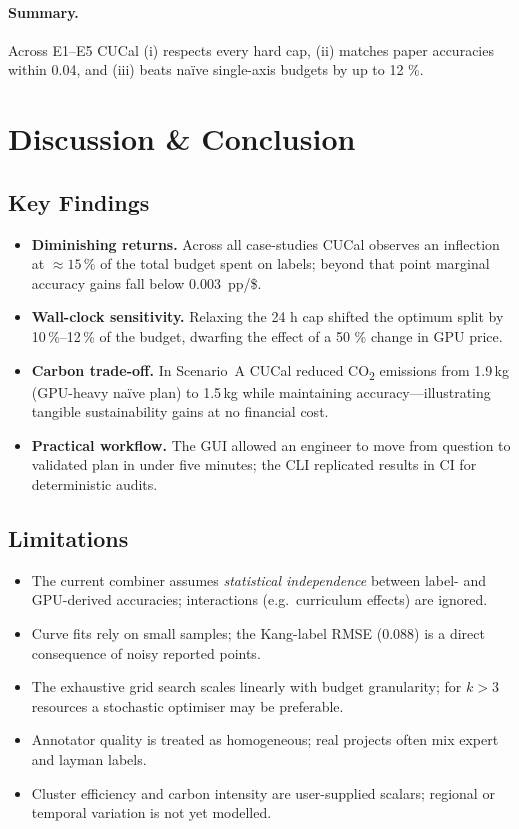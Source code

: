\documentclass[11pt]{article}
\begin{document}
\paragraph{Summary.}
Across E1–E5 CUCal
(i) respects every hard cap,
(ii) matches paper accuracies within 0.04,
and (iii) beats naïve single-axis budgets by up to 12 \%.

\section{Discussion \& Conclusion}\label{sec:discussion}
\subsection{Key Findings}
\setlength\itemsep{0.3em}
\begin{itemize}
  \item \textbf{Diminishing returns.}  Across all case-studies CUCal
        observes an inflection at $\approx\!15$\,\% of the total budget
        spent on labels; beyond that point marginal accuracy gains fall
        below 0.003~pp/\$.
  \item \textbf{Wall-clock sensitivity.}  Relaxing the 24 h cap shifted
        the optimum split by 10\,\%–12\,\% of the budget, dwarfing the effect
        of a 50 \% change in GPU price.
  \item \textbf{Carbon trade-off.}  In Scenario~A CUCal reduced
        CO\textsubscript{2} emissions from 1.9\,kg (GPU-heavy naïve plan) to
        1.5\,kg while maintaining accuracy—illustrating tangible
        sustainability gains at no financial cost.
  \item \textbf{Practical workflow.}  The GUI allowed an engineer to move
        from question to validated plan in under five minutes; the CLI
        replicated results in CI for deterministic audits.
\end{itemize}

\subsection{Limitations}
\begin{itemize}
  \item The current combiner assumes \emph{statistical independence} between
        label- and GPU-derived accuracies; interactions (e.g.\ curriculum
        effects) are ignored.
  \item Curve fits rely on small samples; the Kang-label RMSE (0.088) is a
        direct consequence of noisy reported points.
  \item The exhaustive grid search scales linearly with budget granularity;
        for \(k\!>\!3\) resources a stochastic optimiser may be preferable.
  \item Annotator quality is treated as homogeneous; real projects often
        mix expert and layman labels.
  \item Cluster efficiency and carbon intensity are user-supplied scalars;
        regional or temporal variation is not yet modelled.
\end{itemize}
\end{document}

